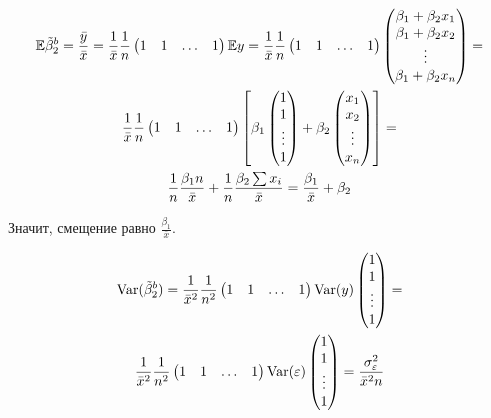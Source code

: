\begin{problem}
\begin{sol}
\begin{multline*}
\mathbb{E}\tilde{\beta}_2^b = \frac{\bar{y}}{\bar{x}} = \frac{1}{\bar{x}} \frac{1}{n} \begin{pmatrix}
1 & 1 & \ldots & 1
\end{pmatrix} \mathbb{E} y = \frac{1}{\bar{x}} \frac{1}{n} \begin{pmatrix}
1 & 1 & \ldots & 1
\end{pmatrix} \begin{pmatrix}
\beta_1 + \beta_2 x_1\\
\beta_1 + \beta_2 x_2\\
\vdots\\
\beta_1 + \beta_2 x_n\\
\end{pmatrix} =\\
\frac{1}{\bar{x}} \frac{1}{n} \begin{pmatrix}
1 & 1 & \ldots & 1
\end{pmatrix} \left[ \beta_1 \begin{pmatrix}
1\\
1\\
\vdots\\
1\\
\end{pmatrix} + \beta_2 \begin{pmatrix}
x_1\\
x_2\\
\vdots\\
x_n\\
\end{pmatrix} \right] = \\
\frac{1}{n} \frac{\beta_1 n}{\bar{x}} + \frac{1}{n} \frac{\beta_2 \sum x_i}{\bar{x}} = \frac{\beta_1}{\bar{x}} + \beta_2
\end{multline*}

Значит, смещение равно $\frac{\beta_1}{\bar{x}}$.

\begin{multline*}
\operatorname{Var}(\tilde{\beta}_2^b) = \frac{1}{\bar{x}^2} \frac{1}{n^2} \begin{pmatrix}
1 & 1 & \ldots & 1
\end{pmatrix} \operatorname{Var}(y) \begin{pmatrix}
1\\
1\\
\vdots\\
1\\
\end{pmatrix} = \\
\frac{1}{\bar{x}^2} \frac{1}{n^2} \begin{pmatrix}
1 & 1 & \ldots & 1
\end{pmatrix} \operatorname{Var}(\varepsilon) \begin{pmatrix}
1\\
1\\
\vdots\\
1\\
\end{pmatrix} = \frac{\sigma_{\varepsilon}^2}{\bar{x}^2 n}
\end{multline*}
\end{sol}
\end{problem}




